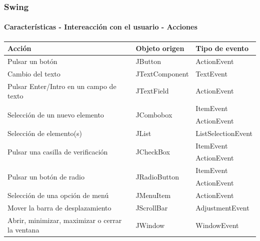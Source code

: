 \documentclass{beamer}
\begin{document}
	\begin{frame}
		\frametitle{Swing}
		\framesubtitle{Caracter\'isticas - Intereacci\'on con el usuario - Acciones}
        {\scriptsize
        \begin{tabular}{p{6cm}p{2.5cm}p{2.5cm}} \hline
            \textbf{Acci\'on} & \textbf{Objeto origen} & \textbf{Tipo de evento} \\ \hline
            \multirow{2}{*}{Pulsar un bot\'on} & \multirow{2}{*}{JButton} & \multirow{2}{*}{ActionEvent} \\ & & \\ \hline
            \multirow{2}{*}{Cambio del texto} & \multirow{2}{*}{JTextComponent} & \multirow{2}{*}{TextEvent} \\ & & \\ \hline
            \multirow{2}{*}{Pulsar Enter/Intro en un campo de texto} & \multirow{2}{*}{JTextField} & \multirow{2}{*}{ActionEvent} \\ & & \\ \hline
            \multirow{2}{*}{Selecci\'on de un nuevo elemento} & \multirow{2}{*}{JCombobox} & ItemEvent \\
            & & ActionEvent \\ \hline
            \multirow{2}{*}{Selecci\'on de elemento(s)} & \multirow{2}{*}{JList} & \multirow{2}{*}{ListSelectionEvent} \\ & & \\ \hline
            \multirow{2}{*}{Pulsar una casilla de verificaci\'on} & \multirow{2}{*}{JCheckBox} & ItemEvent \\
            & & ActionEvent \\ \hline
            \multirow{2}{*}{Pulsar un bot\'on de radio} & \multirow{2}{*}{JRadioButton} & ItemEvent \\
            & & ActionEvent \\ \hline
            \multirow{2}{*}{Selecci\'on de una opci\'on de men\'u} & \multirow{2}{*}{JMenuItem} & \multirow{2}{*}{ActionEvent} \\ & & \\ \hline
            \multirow{2}{*}{Mover la barra de desplazamiento} & \multirow{2}{*}{JScrollBar} & \multirow{2}{*}{AdjustmentEvent} \\ & & \\ \hline
            \multirow{2}{*}{Abrir, minimizar, maximizar o cerrar la ventana} & \multirow{2}{*}{JWindow} & \multirow{2}{*}{WindowEvent} \\ & &\\ \hline
        \end{tabular}}
	\end{frame}
\end{document}
